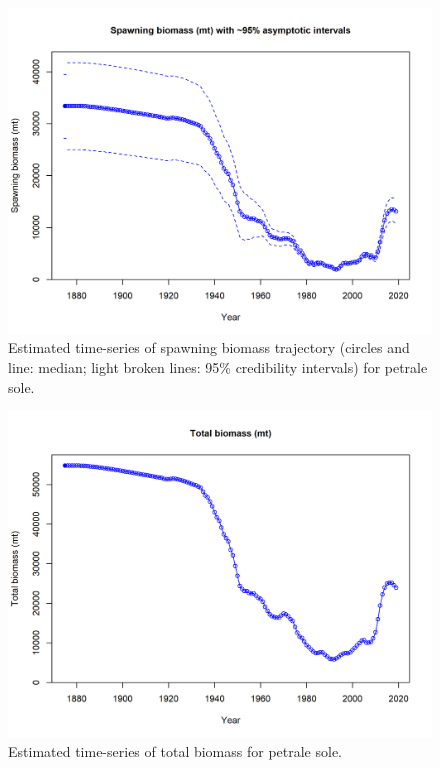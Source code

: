 \documentclass[12pt,]{article}
\begin{document}
\begin{figure}
\centering
\includegraphics{r4ss/plots_mod1/ts7_Spawning_biomass_(mt)_with_95_asymptotic_intervals_intervals}
\caption{Estimated time-series of spawning biomass trajectory (circles
and line: median; light broken lines: 95\% credibility intervals) for
petrale sole. \label{fig:ssb}}
\end{figure}

\FloatBarrier

\begin{figure}
\centering
\includegraphics{r4ss/plots_mod1/ts1_Total_biomass_(mt).png}
\caption{Estimated time-series of total biomass for petrale sole.
\label{fig:total_bio}}
\end{figure}
\end{document}
